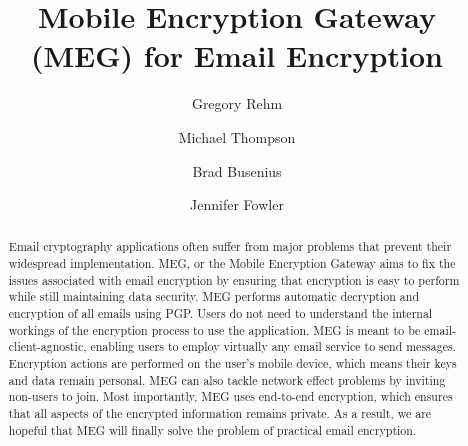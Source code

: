 \documentclass[10pt]{article}
\begin{document}
\title{Mobile Encryption Gateway (MEG) for Email Encryption}

\author{Gregory Rehm} \author{Michael Thompson} \author{Brad Busenius} \author{Jennifer Fowler}

\date {}

\maketitle

\begin{abstract}
\par Email cryptography applications often suffer from major problems that prevent their widespread implementation. MEG, or the Mobile Encryption Gateway aims to fix the issues associated with email encryption by ensuring that encryption is easy to perform while still maintaining data security. MEG performs automatic decryption and encryption of all emails using PGP. Users do not need to understand the internal workings of the encryption process to use the application. MEG is meant to be email-client-agnostic, enabling users to employ virtually any email service to send messages. Encryption actions are performed on the user's mobile device, which means their keys and data remain personal. MEG can also tackle network effect problems by inviting non-users to join. Most importantly, MEG uses end-to-end encryption, which ensures that all aspects of the encrypted information remains private. As a result, we are hopeful that MEG will finally solve the problem of practical email encryption.
\end{abstract}
\end{document}
